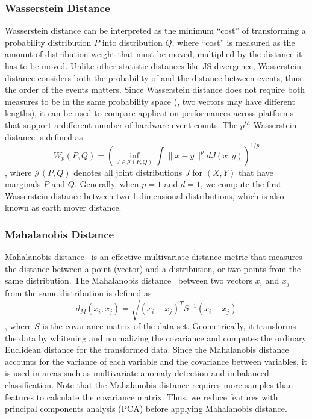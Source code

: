 \subsubsection{Wasserstein Distance}
\label{sec:wass}
Wasserstein distance\cite{rubner2000earth} can be interpreted as the minimum ``cost'' of transforming a probability distribution $P$ into distribution $Q$, where ``cost'' is measured as the amount of distribution weight that must be moved, multiplied by the distance it has to be moved. Unlike other statistic distances like JS divergence, Wasserstein distance considers both the probability of and the distance between events, thus the order of the events matters. Since Wasserstein distance does not require both measures to be in the same probability space (\ie, two vectors may have different lengths), it can be used to compare application performances across platforms that support a different number of hardware event counts. The $p^{th}$ Wasserstein distance is defined as 
\begin{equation}
W_{p}(P, Q)=\left(\inf _{J \in \mathcal{J}(P, Q)} \int\|x-y\|^{p} d J(x, y)\right)^{1 / p}
\end{equation},
where $\mathcal{J}(P, Q)$ denotes all joint distributions $J$ for $(X,Y)$ that have marginals $P$ and $Q$. Generally, when $p = 1$ and $d = 1$, we compute the first Wasserstein distance between two 1-dimensional distributions, which is also known as earth mover distance. 

\subsubsection{Mahalanobis Distance}
Mahalanobis distance~\cite{Mah} is an effective multivariate distance metric that measures the distance between a point (vector) and a distribution, or two points from the same distribution. 
The Mahalanobis distance~\cite{Mah} between two vectors $x_i$ and $x_j$ from the same distribution is defined as
\begin{equation}d_{M}(x_i, x_j)=\sqrt{(x_i-x_j)^{T} S^{-1}(x_i-x_j)}
\end{equation}, where $S$ is the covariance matrix of the data set. Geometrically, it transforms the data by whitening and normalizing the covariance and computes the ordinary Euclidean distance for the transformed data. Since the Mahalanobis distance accounts for the variance of each variable and the covariance between variables, it is used in areas such as multivariate anomaly detection and imbalanced classification. Note that the Mahalanobis distance requires more samples than features to calculate the covariance matrix. Thus, we reduce features with principal components analysis (PCA) before applying Mahalanobis distance.

